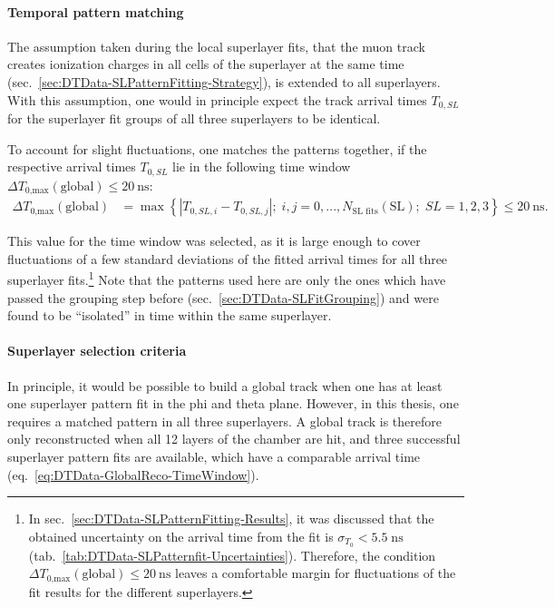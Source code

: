 \paragraph{Temporal pattern matching}
The assumption taken during the local superlayer fits, that the muon track creates ionization charges in all cells of the superlayer at the same time (sec.\ \ref{sec:DTData-SLPatternFitting-Strategy}), is extended to all superlayers. With this assumption, one would in principle expect the track arrival times $T_{0,SL}$ for the superlayer fit groups of all three superlayers to be identical.
\par To account for slight fluctuations, one matches the patterns together, if the respective arrival times $T_{0,SL}$ lie in the following time window $\Delta T_\text{0,max}(\text{global})\leq\SI{20}{\nano\second}$:
\begin{equation}
    \begin{aligned}
        \Delta T_\text{0,max}(\text{global}) & = \max \left\{ \left | T_{0,SL,i} - T_{0,SL,j} \right | ; \; i,j=0,...,N_\text{SL fits}(\text{SL}) ; \; SL=1,2,3 \right\} \leq \SI{20}{\nano\second}.
    \end{aligned}
    \label{eq:DTData-GlobalReco-TimeWindow}
\end{equation}
\par This value for the time window was selected, as it is large enough to cover fluctuations of a few standard deviations of the fitted arrival times for all three superlayer fits.\footnote{In sec.\ \ref{sec:DTData-SLPatternFitting-Results}, it was discussed that the obtained uncertainty on the arrival time from the fit is $\sigma_{T_0}<5.5\;\si{\nano\second}$ (tab.\ \ref{tab:DTData-SLPatternfit-Uncertainties}). Therefore, the condition $\Delta T_\text{0,max}(\text{global})\leq\SI{20}{\nano\second}$ leaves a comfortable margin for fluctuations of the fit results for the different superlayers.} Note that the patterns used here are only the ones which have passed the grouping step before (sec.\ \ref{sec:DTData-SLFitGrouping}) and were found to be \enquote{isolated} in time within the same superlayer. 
\paragraph{Superlayer selection criteria}
In principle, it would be possible to build a global track when one has at least one superlayer pattern fit in the phi and theta plane. However, in this thesis, one requires a matched pattern in all three superlayers. A global track is therefore only reconstructed when all 12 layers of the chamber are hit, and three successful superlayer pattern fits are available, which have a comparable arrival time (eq.\ \ref{eq:DTData-GlobalReco-TimeWindow}).

